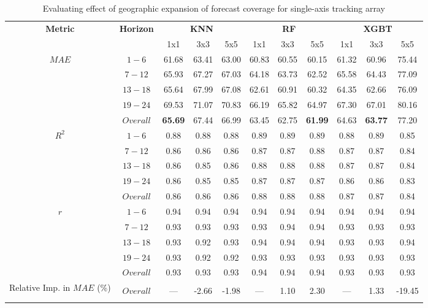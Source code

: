 \begin{table}[h]
\begin{center}
    \caption{Evaluating effect of geographic expansion of forecast coverage for single-axis tracking array}
    \begin{tabular}{c c c c c c c c c c c}
        \toprule
        \multirow{2}{*}{\textbf{Metric}} & \multirow{2}{*}{\textbf{Horizon}} & \multicolumn{3}{c}{\textbf{KNN}} & \multicolumn{3}{c}{\textbf{RF}} & \multicolumn{3}{c}{\textbf{XGBT}}\\
        \cmidrule{3-11}
         &  & 1x1 & 3x3 & 5x5 & 1x1 & 3x3 & 5x5 & 1x1 & 3x3 & 5x5 \\
        \midrule
        \multirow{5}{*}{$MAE$} & $1 - 6$ & 61.68 & 63.41 & 63.00 & 60.83 & 60.55 & 60.15 & 61.32 & 60.96 & 75.44 \\
        & $7 - 12$ & 65.93 & 67.27 & 67.03 & 64.18 & 63.73 & 62.52  & 65.58 & 64.43 & 77.09 \\
        & $13 - 18$ & 65.64 & 67.99 & 67.08 & 62.61 & 60.91 & 60.32 & 64.35 & 62.66 & 76.09 \\
        & $19 - 24$ & 69.53 & 71.07 & 70.83 & 66.19 & 65.82 & 64.97 & 67.30 & 67.01 & 80.16 \\
        & $Overall$ & \textbf{65.69} & 67.44 & 66.99 & 63.45 & 62.75 & \textbf{61.99} & 64.63 & \textbf{63.77} & 77.20 \\
        \midrule
        \multirow{5}{*}{$R^2$} & $1 - 6$ & 0.88 & 0.88 & 0.88 & 0.89 & 0.89 & 0.89 & 0.88 & 0.89 & 0.85 \\
        & $7 - 12$ & 0.86 & 0.86 & 0.86 & 0.87 & 0.87 & 0.88 & 0.87 & 0.87 & 0.84 \\
        & $13 - 18$ & 0.86 & 0.85 & 0.86 & 0.88 & 0.88 & 0.88 & 0.87 & 0.87 & 0.84 \\
        & $19 - 24$ & 0.86 & 0.85 & 0.85 & 0.87 & 0.87 & 0.87 & 0.86 & 0.86 & 0.83 \\
        & $Overall$ & 0.86 & 0.86 & 0.86 & 0.88 & 0.88 & 0.88 & 0.87 & 0.87 & 0.84 \\
        \midrule
        \multirow{5}{*}{$r$} & $1 - 6$ & 0.94 & 0.94 & 0.94 & 0.94 & 0.94 & 0.94 & 0.94 & 0.94 & 0.94 \\
        & $7 - 12$ & 0.93 & 0.93 & 0.93 & 0.93 & 0.94 & 0.94 & 0.93 & 0.93 & 0.93 \\
        & $13 - 18$ & 0.93 & 0.92 & 0.93 & 0.94 & 0.94 & 0.94 & 0.93 & 0.93 & 0.94 \\
        & $19 - 24$ & 0.93 & 0.92 & 0.92 & 0.93 & 0.93 & 0.93 & 0.93 & 0.93 & 0.93 \\
        & $Overall$ & 0.93 & 0.93 & 0.93 & 0.94 & 0.94 & 0.94 & 0.93 & 0.93 & 0.93 \\
        \bottomrule
        \multirow{3}{5em}{Relative Imp. in $MAE$ (\%)} & & & & & & & & & & \\ 
        & $Overall$ & --- & -2.66 & -1.98 & --- & 1.10 & 2.30 & --- & 1.33 & -19.45 \\
        & & & & & & & & & & \\
        \bottomrule
    \end{tabular}
\end{center}
\end{table}

